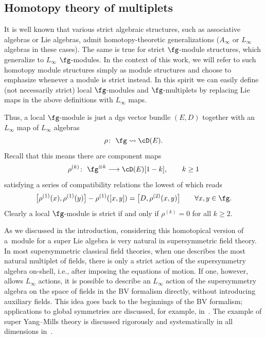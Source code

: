 \subsection{Homotopy theory of multiplets}
%
It is well known that various strict algebraic structures, such as associative algebras or Lie algebras, admit homotopy-theoretic generalizations ($A_\infty$ or $L_\infty$ algebras in these cases). The same is true for strict $\fg$-module structures,
which generalize to $L_\infty$ $\fg$-modules. In the context of this work, we will refer to such homotopy module structures simply as module structures and choose to emphasize whenever a module is strict instead. In this spirit we can easily define (not necessarily strict) local $\fg$-modules and $\fg$-multiplets by replacing Lie maps in the above definitions with $L_\infty$ maps.

Thus, a local $\fg$-module is just a dgs vector bundle $(E,D)$ together with an $L_\infty$ map of $L_\infty$ algebras
\begin{equation*}
\rho \colon \ \fg \rightsquigarrow \cD(E) .
\end{equation*}
Recall that this means there are component maps
\begin{equation*}
\rho^{(k)} \colon \ \fg^{\otimes k} \longrightarrow \cD(E)[1-k], \qquad k \geq 1
\end{equation*}
satisfying a series of compatibility relations the lowest of which reads
\begin{equation*}%
\big[\rho^{(1)}(x),\rho^{(1)}(y)\big] - \rho^{(1)}([x,y]) =\big[D, \rho^{(2)}(x,y)\big] \qquad \forall x,y \in \fg.
\end{equation*}
Clearly a local $\fg$-module is strict if and only if $\rho^{(k)} = 0$ for all $k\geq2$.

\begin{rmk}
	As we discussed in the introduction, considering this homotopical version of a~module for a super Lie algebra is very natural in supersymmetric field theory. In most supersymmetric classical field theories, when one describes the most natural multiplet of fields, there is only a strict action of the supersymmetry algebra on-shell, i.e., after imposing the equations of motion. If one, however, allows $L_\infty$ actions, it is possible to describe an $L_\infty$ action of the supersymmetry algebra on the space of fields in the BV formalism directly, without introducing auxiliary fields. This idea goes back to the beginnings of the BV formalism; applications to global symmetries are discussed, for example, in~\cite{BaulieuSusy}. The example of super Yang--Mills theory is discussed rigorously and systematically in all dimensions in~\cite{ESW}.
\end{rmk}


